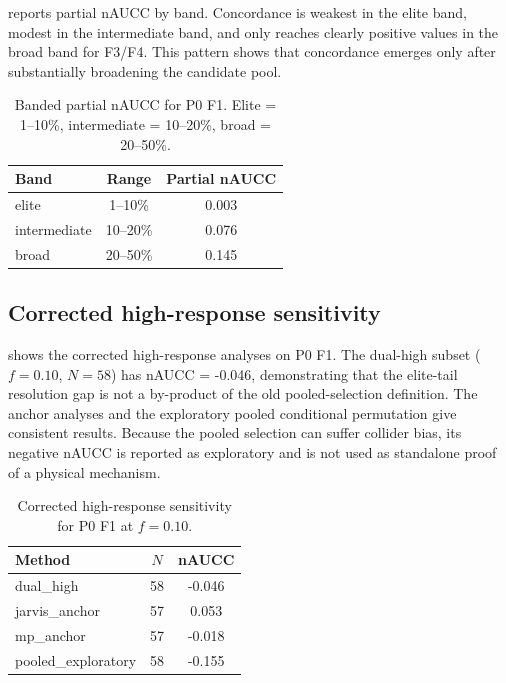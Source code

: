\documentclass[11pt]{article}
\newcommand{\PZeroFOneEliteNaucc}{0.003}
\newcommand{\PZeroFOneIntermediateNaucc}{0.076}
\newcommand{\PZeroFOneBroadNaucc}{0.145}
\newcommand{\PZeroFOneDualHighTenNaucc}{-0.046}
\newcommand{\PZeroFOneDualHighTenN}{58}
\begin{document}
 reports partial nAUCC by band.
Concordance is weakest in the elite band, modest in the intermediate band, and only reaches clearly positive values in the broad band for F3/F4.
This pattern shows that concordance emerges only after substantially broadening the candidate pool.

\begin{table}[htbp]
\centering
\caption{Banded partial nAUCC for P0 F1. Elite = 1--10\%, intermediate = 10--20\%, broad = 20--50\%.}
\label{tab:bands}
\begin{tabular}{lcc}
\toprule
Band & Range & Partial nAUCC \\
\midrule
elite & 1--10\% & \PZeroFOneEliteNaucc{} \\
intermediate & 10--20\% & \PZeroFOneIntermediateNaucc{} \\
broad & 20--50\% & \PZeroFOneBroadNaucc{} \\
\bottomrule
\end{tabular}
\end{table}

\subsection{Corrected high-response sensitivity}
 shows the corrected high-response analyses on P0 F1.
The dual-high subset ($f=0.10$, $N=\PZeroFOneDualHighTenN{}$) has nAUCC = \PZeroFOneDualHighTenNaucc{}, demonstrating that the elite-tail resolution gap is not a by-product of the old pooled-selection definition.
The anchor analyses and the exploratory pooled conditional permutation give consistent results.
Because the pooled selection can suffer collider bias, its negative nAUCC is reported as exploratory and is not used as standalone proof of a physical mechanism.

\begin{table}[htbp]
\centering
\caption{Corrected high-response sensitivity for P0 F1 at $f=0.10$.}
\label{tab:highresponse}
\begin{tabular}{lcc}
\toprule
Method & $N$ & nAUCC \\
\midrule
dual\_high & \PZeroFOneDualHighTenN{} & \PZeroFOneDualHighTenNaucc{} \\
jarvis\_anchor & 57 & 0.053 \\
mp\_anchor & 57 & -0.018 \\
pooled\_exploratory & 58 & -0.155 \\
\bottomrule
\end{tabular}
\end{table}
\end{document}

